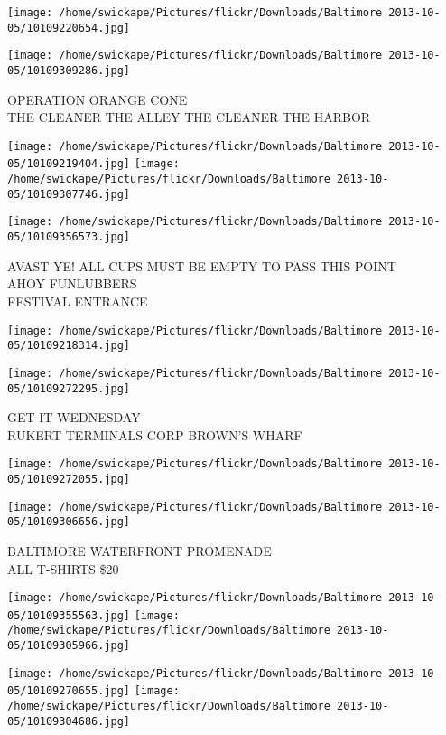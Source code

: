 \documentclass[10pt,letterpaper]{article}
\begin{document}
\texttt{[image: /home/swickape/Pictures/flickr/Downloads/Baltimore 2013-10-05/10109220654.jpg]}

\vspace{0.25in}
\texttt{[image: /home/swickape/Pictures/flickr/Downloads/Baltimore 2013-10-05/10109309286.jpg]}

OPERATION ORANGE CONE\\
THE CLEANER THE ALLEY THE CLEANER THE HARBOR
\pagebreak

\texttt{[image: /home/swickape/Pictures/flickr/Downloads/Baltimore 2013-10-05/10109219404.jpg]}
\texttt{[image: /home/swickape/Pictures/flickr/Downloads/Baltimore 2013-10-05/10109307746.jpg]}

\vspace{0.25in}
\texttt{[image: /home/swickape/Pictures/flickr/Downloads/Baltimore 2013-10-05/10109356573.jpg]}

AVAST YE! ALL CUPS MUST BE EMPTY TO PASS THIS POINT\\
AHOY FUNLUBBERS\\
FESTIVAL ENTRANCE
\pagebreak

\texttt{[image: /home/swickape/Pictures/flickr/Downloads/Baltimore 2013-10-05/10109218314.jpg]}

\vspace{0.25in}
\texttt{[image: /home/swickape/Pictures/flickr/Downloads/Baltimore 2013-10-05/10109272295.jpg]}

GET IT WEDNESDAY\\
RUKERT TERMINALS CORP BROWN'S WHARF
\pagebreak

\texttt{[image: /home/swickape/Pictures/flickr/Downloads/Baltimore 2013-10-05/10109272055.jpg]}

\vspace{0.25in}
\texttt{[image: /home/swickape/Pictures/flickr/Downloads/Baltimore 2013-10-05/10109306656.jpg]}

BALTIMORE WATERFRONT PROMENADE\\
ALL T{-}SHIRTS \$20
\pagebreak

\texttt{[image: /home/swickape/Pictures/flickr/Downloads/Baltimore 2013-10-05/10109355563.jpg]}
\texttt{[image: /home/swickape/Pictures/flickr/Downloads/Baltimore 2013-10-05/10109305966.jpg]}

\texttt{[image: /home/swickape/Pictures/flickr/Downloads/Baltimore 2013-10-05/10109270655.jpg]}
\texttt{[image: /home/swickape/Pictures/flickr/Downloads/Baltimore 2013-10-05/10109304686.jpg]}
\end{document}
